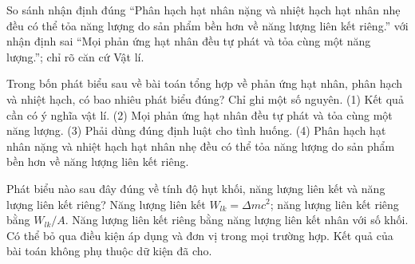 \begin{bt}
So sánh nhận định đúng “Phân hạch hạt nhân nặng và nhiệt hạch hạt nhân nhẹ đều có thể tỏa năng lượng do sản phẩm bền hơn về năng lượng liên kết riêng.” với nhận định sai “Mọi phản ứng hạt nhân đều tự phát và tỏa cùng một năng lượng.”; chỉ rõ căn cứ Vật lí.
\end{bt}

\begin{ex}
Trong bốn phát biểu sau về bài toán tổng hợp về phản ứng hạt nhân, phân hạch và nhiệt hạch, có bao nhiêu phát biểu đúng? Chỉ ghi một số nguyên. (1) Kết quả cần có ý nghĩa vật lí. (2) Mọi phản ứng hạt nhân đều tự phát và tỏa cùng một năng lượng. (3) Phải dùng đúng định luật cho tình huống. (4) Phân hạch hạt nhân nặng và nhiệt hạch hạt nhân nhẹ đều có thể tỏa năng lượng do sản phẩm bền hơn về năng lượng liên kết riêng.
\end{ex}

\begin{ex}
Phát biểu nào sau đây đúng về tính độ hụt khối, năng lượng liên kết và năng lượng liên kết riêng?
\choice
{\True Năng lượng liên kết $W_{lk}=\Delta m c^2$; năng lượng liên kết riêng bằng $W_{lk}/A$.}
{Năng lượng liên kết riêng bằng năng lượng liên kết nhân với số khối.}
{Có thể bỏ qua điều kiện áp dụng và đơn vị trong mọi trường hợp.}
{Kết quả của bài toán không phụ thuộc dữ kiện đã cho.}
\end{ex}

